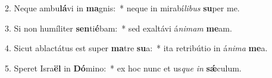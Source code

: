 2. Neque ambu\textbf{lá}vi in \textbf{ma}gnis:~*  neque in mirabí\textit{li}\textit{bus} \textbf{su}per me.\

3. Si non humíliter \textbf{sen}ti\textbf{é}bam:~*  sed exaltávi á\textit{ni}\textit{mam} \textbf{me}am.\

4. Sicut ablactátus est super \textbf{ma}tre \textbf{su}a:~*  ita retribútio in á\textit{ni}\textit{ma} \textbf{me}a.\

5. Speret Isra\textbf{ël} in \textbf{Dó}mino:~*  ex hoc nunc et us\textit{que} \textit{in} \textbf{sǽ}culum.\

